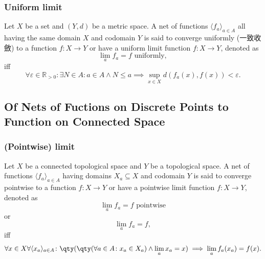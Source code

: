 \subsubsection{Uniform limit}
Let $X$ be a set and $(Y,d)$ be a metric space. A net of functions $\langle f_a\rangle_{a\in A}$ all having the same domain $X$ and codomain $Y$ is said to converge uniformly (一致收斂) to a function $f\colon X\to Y$ or have a uniform limit function $f\colon X\to Y$, denoted as 
\[\lim_af_a=f\text{\ uniformly},\]
iff
\[\forall\varepsilon\in\mathbb{R}_{>0}\colon\exists N\in A\colon a\in A\land N\leq a\implies\sup_{x\in X}d(f_a(x),f(x))<\varepsilon.\]
\subsection{Of Nets of Fuctions on Discrete Points to Function on Connected Space}
\subsubsection{(Pointwise) limit}
Let $X$ be a connected topological space and $Y$ be a topological space. A net of functions $\langle f_a\rangle_{a\in A}$ having domains $X_a\subseteq X$ and codomain $Y$ is said to converge pointwise to a function $f\colon X\to Y$ or have a pointwise limit function $f\colon X\to Y$, denoted as 
\[\lim_af_a=f\text{\ pointwise}\]
or
\[\lim_af_a=f,\]
iff
\[\forall x\in X\forall\langle x_a\rangle_{a\in A}\colon\qty(\qty(\forall a\in A\colon x_a\in X_a)\land\lim_ax_a=x)\implies\lim_af_a(x_a)=f(x).\]
